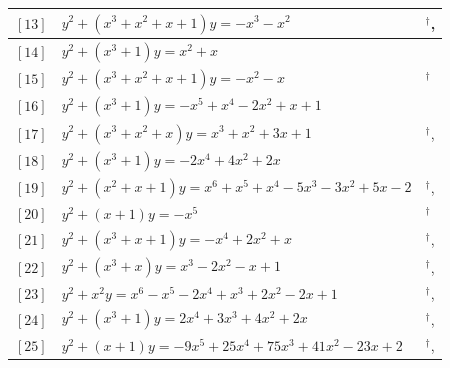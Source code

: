 \documentclass[11pt]{amsart}
\begin{document}
\begin{longtable}{|>{\raggedright\arraybackslash}p{1.7cm}|>{\raggedright\arraybackslash}p{}|>{\raggedright\arraybackslash}p{2.1cm}|}
$[13]$ & \href{https://www.lmfdb.org/Genus2Curve/Q/349/a/349/1}{$y^2 + (x^{3}+x^{2}+x+1)y = -x^{3}-x^{2}$} & \cite{Flynn1990,Leprevost1991a}$^\dagger$, \cite{PZP2013}\\ \hline
$[14]$ & \href{https://www.lmfdb.org/Genus2Curve/Q/249/a/249/1}{$y^2 + (x^{3}+1)y = x^{2}+x$} & \cite{PP2012,PZP2013}\\ \hline
$[15]$ & \href{https://www.lmfdb.org/Genus2Curve/Q/277/a/277/1}{$y^2 + (x^{3}+x^{2}+x+1)y = -x^{2}-x$} & \cite{Leprevost1991b}$^\dagger$\\ \hline
$[16]$ & \href{https://www.lmfdb.org/Genus2Curve/Q/830/a/6640/1}{$y^2 + (x^{3}+1)y = -x^{5}+x^{4}-2x^{2}+x+1$} & \cite{BSSVY}\\ \hline
$[17]$ & \href{https://www.lmfdb.org/Genus2Curve/Q/1996/b/510976/1}{$y^2 + (x^{3}+x^{2}+x)y = x^{3}+x^{2}+3x+1$} & \cite{Leprevost1991b}$^\dagger$, \cite{PZP2013}\\ \hline
$[18]$ & \href{https://www.lmfdb.org/Genus2Curve/Q/1180/a/18880/1}{$y^2 + (x^{3}+1)y = -2x^{4}+4x^{2}+2x$} & \cite{PP2012,PZP2013}\\ \hline
$[19]$ & \href{https://alpha.lmfdb.org/Genus2Curve/Q/?jump=[[-2,5,-3,-5,1,1,1],[1,1,1]]}{$y^2 + (x^{2}+x+1)y = x^{6}+x^{5}+x^{4}-5x^{3}-3x^{2}+5x-2$} & \cite{Leprevost1991b}$^\dagger$, \cite{PZP2013}\\ \hline
$[20]$ & \href{https://www.lmfdb.org/Genus2Curve/Q/394/a/3152/1}{$y^2 + (x+1)y = -x^{5}$} & \cite{Leprevost1997}$^\dagger$\\ \hline
$[21]$ & \href{https://www.lmfdb.org/Genus2Curve/Q/388/a/776/1}{$y^2 + (x^{3}+x+1)y = -x^{4}+2x^{2}+x$} & \cite{Leprevost1991b}$^\dagger$, \cite{Nicholls2018}\\ \hline
$[22]$ & \href{https://www.lmfdb.org/Genus2Curve/Q/1192/a/19072/1}{$y^2 + (x^{3}+x)y = x^{3}-2x^{2}-x+1$} & \cite{Leprevost1993}$^\dagger$, \cite{Leprevost1995}\\ \hline
$[23]$ & \href{https://alpha.lmfdb.org/Genus2Curve/Q/?jump=[[1,-2,2,1,-2,-1,1],[0,0,1]]}{$y^2 + x^{2}y = x^{6}-x^{5}-2x^{4}+x^{3}+2x^{2}-2x+1$} & \cite{Ogawa1994}$^\dagger$, \cite{Leprevost1995}\\ \hline
$[24]$ & \href{https://www.lmfdb.org/Genus2Curve/Q/1908/a/183168/1}{$y^2 + (x^{3}+1)y = 2x^{4}+3x^{3}+4x^{2}+2x$} & \cite{Leprevost1993}$^\dagger$, \cite{Leprevost1995}\\ \hline
$[25]$ & \href{https://alpha.lmfdb.org/Genus2Curve/Q/?jump=[[2,-23,41,75,25,-9],[1,1]]}{$y^2 + (x+1)y = -9x^{5}+25x^{4}+75x^{3}+41x^{2}-23x+2$} & \cite{Leprevost1993}$^\dagger$, \cite{Nicholls2018}\\ \hline

\end{longtable}
\end{document}
